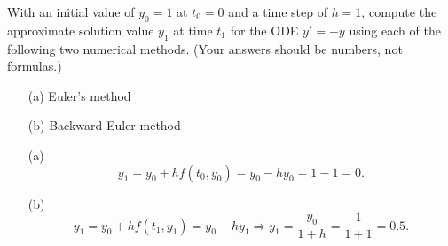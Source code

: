 \begin{pro}
  With an initial value of $y_0=1$ at $t_0=0$
  and a time step of $h=1$,
  compute the approximate solution value $y_1$ at time $t_1$
  for the ODE $y' = -y$ using each of the following two numerical methods.
  (Your answers should be numbers, not formulas.)
  \begin{itemize}
  \item[(a)]
    Euler's method

  \item[(b)]
    Backward Euler method
  \end{itemize}
\end{pro}

\begin{sol}
  \begin{itemize}
  \item[(a)]
    \begin{displaymath}
      y_1 = y_0+hf(t_0,y_0) = y_0-hy_0 = 1 - 1 = 0.
    \end{displaymath}

  \item[(b)]
    \begin{displaymath}
      y_1 = y_0 + hf(t_1, y_1) = y_0-hy_1 \Rightarrow
      y_1 = \frac{y_0}{1+h} = \frac{1}{1+1} = 0.5.
    \end{displaymath}
  \end{itemize}
\end{sol}

